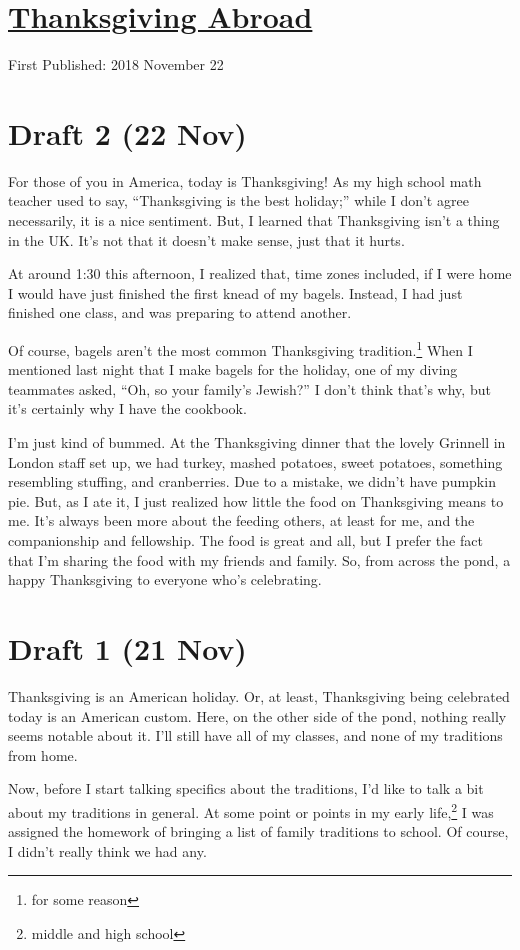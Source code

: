 \documentclass[12pt]{article}[titlepage]
\newcommand{\say}[1]{``#1''}
\newcommand{\1}{\={a}}
\newcommand{\2}{\={e}}
\newcommand{\3}{\={\i}}
\newcommand{\4}{\=o}
\newcommand{\5}{\=u}
\newcommand{\6}{\={A}}
\renewcommand{\,}{\textsuperscript{,}}
\begin{document}
\doublespacing
\section{\href{thanksgiving-2018.html}{Thanksgiving Abroad}}
First Published: 2018 November 22
\section{Draft 2 (22 Nov)}
For those of you in America, today is Thanksgiving!
As my high school math teacher used to say, \say{Thanksgiving is the best holiday;} while I don't agree necessarily, it is a nice sentiment.
But, I learned that Thanksgiving isn't a thing in the UK.
It's not that it doesn't make sense, just that it hurts.

At around 1:30 this afternoon, I realized that, time zones included, if I were home I would have just finished the first knead of my bagels.
Instead, I had just finished one class, and was preparing to attend another.

Of course, bagels aren't the most common Thanksgiving tradition.\footnote{for some reason}
When I mentioned last night that I make bagels for the holiday, one of my diving teammates asked, \say{Oh, so your family's Jewish?}
I don't think that's why, but it's certainly why I have the cookbook.

I'm just kind of bummed.
At the Thanksgiving dinner that the lovely Grinnell in London staff set up, we had turkey, mashed potatoes, sweet potatoes, something resembling stuffing, and cranberries.
Due to a mistake, we didn't have pumpkin pie.
But, as I ate it, I just realized how little the food on Thanksgiving means to me.
It's always been more about the feeding others, at least for me, and the companionship and fellowship.
The food is great and all, but I prefer the fact that I'm sharing the food with my friends and family.
So, from across the pond, a happy Thanksgiving to everyone who's celebrating.

\section{Draft 1 (21 Nov)}
Thanksgiving is an American holiday.
Or, at least, Thanksgiving being celebrated today is an American custom.
Here, on the other side of the pond, nothing really seems notable about it.
I'll still have all of my classes, and none of my traditions from home.

Now, before I start talking specifics about the traditions, I'd like to talk a bit about my traditions in general.
At some point or points in my early life,\footnote{middle and high school} I was assigned the homework of bringing a list of family traditions to school.
Of course, I didn't really think we had any.
\end{document}
